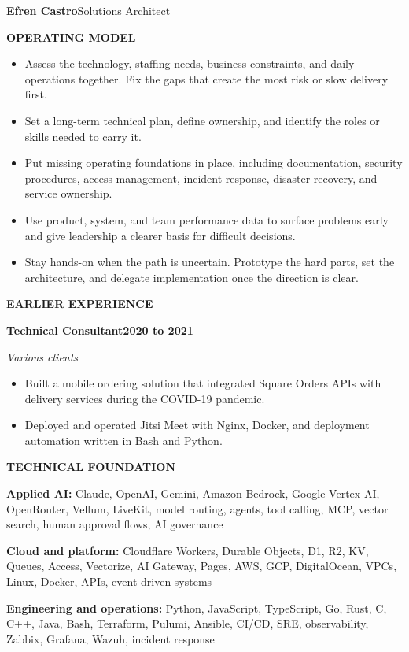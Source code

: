 \documentclass[10pt,letterpaper]{article}
\newcommand{\resumeSection}[1]{%
  \vspace{6pt}%
  {\color{navy}\bfseries\fontsize{11.5}{13}\selectfont\MakeUppercase{#1}}\par
  \vspace{1pt}{\color{navy}\rule{\textwidth}{0.7pt}}\vspace{1.5pt}
}
\newcommand{\roleLine}[3]{%
  {\bfseries\fontsize{11.2}{13}\selectfont #1}\hfill{\bfseries #3}\par
  {\color{muted}\itshape #2}\par
}
\newenvironment{resumeItems}{%
  \begin{itemize}[leftmargin=0.20in,label={\color{navy}\raisebox{0.25ex}{\rule{0.55ex}{0.55ex}}},itemsep=4pt,topsep=2pt,parsep=0pt,partopsep=0pt]
}{\end{itemize}}
\begin{document}
\newpage

{\color{navy}\bfseries\fontsize{13}{15}\selectfont Efren Castro}\hfill{\color{muted}\small Solutions Architect}\par

\resumeSection{Operating Model}
\begin{resumeItems}
  \item Assess the technology, staffing needs, business constraints, and daily operations together. Fix the gaps that create the most risk or slow delivery first.
  \item Set a long-term technical plan, define ownership, and identify the roles or skills needed to carry it.
  \item Put missing operating foundations in place, including documentation, security procedures, access management, incident response, disaster recovery, and service ownership.
  \item Use product, system, and team performance data to surface problems early and give leadership a clearer basis for difficult decisions.
  \item Stay hands-on when the path is uncertain. Prototype the hard parts, set the architecture, and delegate implementation once the direction is clear.
\end{resumeItems}

\resumeSection{Earlier Experience}
\roleLine{Technical Consultant}{Various clients}{2020 to 2021}
\begin{resumeItems}
  \item Built a mobile ordering solution that integrated Square Orders APIs with delivery services during the COVID-19 pandemic.
  \item Deployed and operated Jitsi Meet with Nginx, Docker, and deployment automation written in Bash and Python.
\end{resumeItems}

\resumeSection{Technical Foundation}
\textbf{Applied AI:} Claude, OpenAI, Gemini, Amazon Bedrock, Google Vertex AI, OpenRouter, Vellum, LiveKit, model routing, agents, tool calling, MCP, vector search, human approval flows, AI governance

\textbf{Cloud and platform:} Cloudflare Workers, Durable Objects, D1, R2, KV, Queues, Access, Vectorize, AI Gateway, Pages, AWS, GCP, DigitalOcean, VPCs, Linux, Docker, APIs, event-driven systems

\textbf{Engineering and operations:} Python, JavaScript, TypeScript, Go, Rust, C, C++, Java, Bash, Terraform, Pulumi, Ansible, CI/CD, SRE, observability, Zabbix, Grafana, Wazuh, incident response
\end{document}
